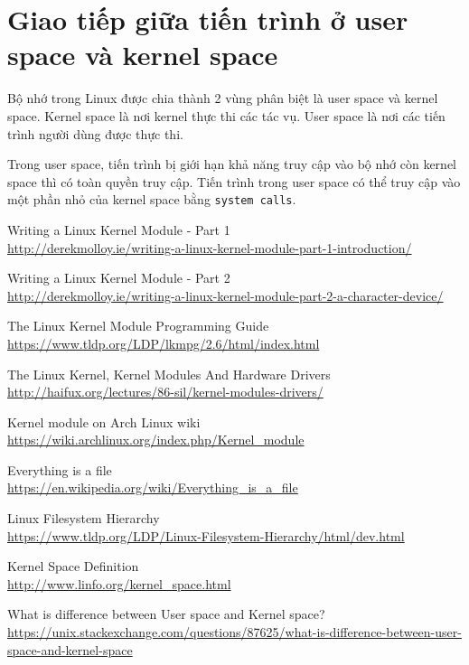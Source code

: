 \documentclass[12pt]{article}
\begin{document}
\section{Giao tiếp giữa tiến trình ở user space và kernel space}

Bộ nhớ trong Linux được chia thành 2 vùng phân biệt là user space và kernel space. 
Kernel space là nơi kernel thực thi các tác vụ. 
User space là nơi các tiến trình người dùng được thực thi.

Trong user space, tiến trình bị giới hạn khả năng truy cập vào bộ nhớ còn kernel space thì có toàn quyền truy cập.
Tiến trình trong user space có thể truy cập vào một phần nhỏ của kernel space bằng \texttt{system calls}.

\begin{thebibliography}{1}

 Writing a Linux Kernel Module - Part 1 \\
\url{http://derekmolloy.ie/writing-a-linux-kernel-module-part-1-introduction/}

  Writing a Linux Kernel Module - Part 2 \\
\url{http://derekmolloy.ie/writing-a-linux-kernel-module-part-2-a-character-device/}

 The Linux Kernel Module Programming Guide \\
\url{https://www.tldp.org/LDP/lkmpg/2.6/html/index.html}

 The Linux Kernel, Kernel Modules And Hardware Drivers \\
\url{http://haifux.org/lectures/86-sil/kernel-modules-drivers/}

 Kernel module on Arch Linux wiki \\
\url{https://wiki.archlinux.org/index.php/Kernel_module}

 Everything is a file \\
\url{https://en.wikipedia.org/wiki/Everything_is_a_file}

 Linux Filesystem Hierarchy \\
\url{https://www.tldp.org/LDP/Linux-Filesystem-Hierarchy/html/dev.html}

 Kernel Space Definition \\
\url{http://www.linfo.org/kernel_space.html}

 What is difference between User space and Kernel space? \\
\url{https://unix.stackexchange.com/questions/87625/what-is-difference-between-user-space-and-kernel-space}

\end{thebibliography}
\end{document}

